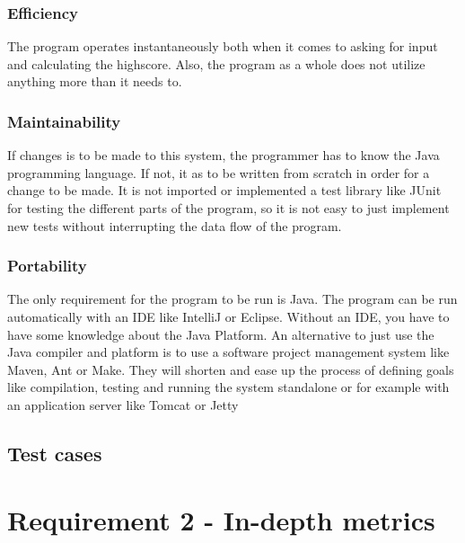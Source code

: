 \documentclass[UKenglish]{article}  %
\begin{document}
\subsubsection{Efficiency}
The program operates instantaneously both when it comes to asking for input and calculating the highscore. Also, the
program as a whole does not utilize anything more than it needs to.

\subsubsection{Maintainability} %
If changes is to be made to this system, the programmer has to know the Java programming language. If not, it as to be
written from scratch in order for a change to be made. It is not imported or implemented a test library like JUnit for
testing the different parts of the program, so it is not easy to just implement new tests without interrupting the data
flow of the program.

\subsubsection{Portability}
The only requirement for the program to be run is Java. The program can be run automatically with an IDE like IntelliJ
or Eclipse. Without an IDE, you have to have some knowledge about the Java Platform. An alternative to just use the Java
compiler and platform is to use a software project management system like Maven, Ant or Make. They will shorten and ease
up the process of defining goals like compilation, testing and running the system standalone or for example with an
application server like Tomcat or Jetty


\subsection{Test cases}

\section{Requirement 2 - In-depth metrics}
\end{document}

